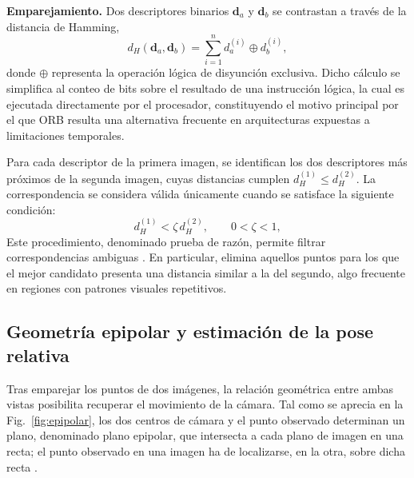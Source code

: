 \textbf{Emparejamiento.}
Dos descriptores binarios $\mathbf{d}_a$ y $\mathbf{d}_b$ se contrastan a través de la distancia de Hamming,
\begin{equation}
d_H(\mathbf{d}_a,\mathbf{d}_b) = \sum_{i=1}^{n} d_a^{(i)} \oplus d_b^{(i)},
\label{eq:hamming}
\end{equation}
donde $\oplus$ representa la operación lógica de disyunción exclusiva.
Dicho cálculo se simplifica al conteo de bits sobre el resultado de una instrucción lógica, la cual es ejecutada directamente por el procesador, constituyendo el motivo principal por el que ORB resulta una alternativa frecuente en arquitecturas expuestas a limitaciones temporales.


Para cada descriptor de la primera imagen, se identifican los dos descriptores más próximos de la segunda imagen, cuyas distancias cumplen $d_H^{(1)} \le d_H^{(2)}$.
La correspondencia se considera válida únicamente cuando se satisface la siguiente condición:
\begin{equation}
d_H^{(1)} < \zeta\, d_H^{(2)},
\qquad
0 < \zeta < 1,
\label{eq:lowe}
\end{equation}
Este procedimiento, denominado prueba de razón, permite filtrar correspondencias ambiguas \cite{lowe2004sift}.
En particular, elimina aquellos puntos para los que el mejor candidato presenta una distancia similar a la del segundo, algo frecuente en regiones con patrones visuales repetitivos.


\subsection{Geometría epipolar y estimación de la pose relativa}

Tras emparejar los puntos de dos imágenes, la relación geométrica entre ambas vistas posibilita recuperar el movimiento de la cámara.
Tal como se aprecia en la Fig.~\ref{fig:epipolar}, los dos centros de cámara y el punto observado determinan un plano, denominado plano epipolar, que intersecta a cada plano de imagen en una recta; el punto observado en una imagen ha de localizarse, en la otra, sobre dicha recta \cite{hartley2003mvg}.

